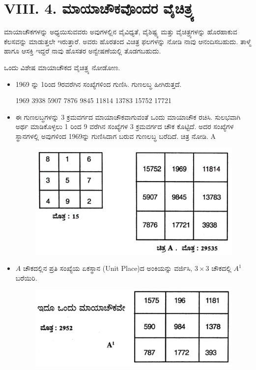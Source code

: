 \section*{VIII. 4. ಮಾಯಾಚೌಕವೊಂದರ ವೈಚಿತ್ರ್ಯ}

ಮಾಯಾಚೌಕಗಳನ್ನು ಅಧ್ಯಯಿಸುವವರು ಅವುಗಳಲ್ಲಿನ ವೈವಿಧ್ಯತೆ, ವೈಶಿಷ್ಟ್ಯ ಮತ್ತು ವೈಚಿತ್ರ್ಯಗಳನ್ನು ಹೊರಹಾಕುವ ಕೆಲಸವನ್ನು ಮಾಡುತ್ತಲೇ ಇರುತ್ತಾರೆ. ಅವರು ಹೊರತಂದ ವಿಚಿತ್ರ ಫಲಗಳನ್ನು ನೋಡಿ ನಾವು ಆನಂದಿಸಬಹುದು. ತಾಳ್ಮೆ ಹಾಗೂ ಆಸಕ್ತಿ ಇದ್ದರೆ ನಾವು ಹೊಸತರ ಅನ್ವೇಷಣೆಯಲ್ಲಿ ತೊಡಗಬಹುದು.

ಒಂದು ವಿಶೇಷ ಮಾಯಾಚೌಕದ ವೈಚಿತ್ರ್ಯ ನೋಡೋಣ.

\begin{itemize}
	\item 1969 ನ್ನು 1ರಿಂದ 9ರವರೆಗಿನ ಸಂಖ್ಯೆಗಳಿಂದ ಗುಣಿಸಿ. ಗುಣಲಬ್ಧ ಹೀಗಿರುತ್ತದೆ.

	1969 3938 5907 7876 9845 11814 13783 15752 17721
	\item ಈ ಗುಣಲಬ್ಧಗಳನ್ನು 3 ಕ್ರಮವರ್ಗದ ಮಾಯಾಚೌಕವಾಗುವಂತೆ ಒಂದು ಮಾಯಾಚೌಕ ರಚಿಸಿ. ಸುಲಭವಾಗಿ ಅರ್ಥ ಮಾಡಿಕೊಳ್ಳಲು 1 ರಿಂದ 9 ವರೆಗಿನ ಸಂಖ್ಯೆಗಳ 3 ಕ್ರಮವರ್ಗದ ಚೌಕ ಕೊಟ್ಟಿದೆ. ಅದರ ಸಂಖ್ಯೆಗಳ ಸ್ಥಾನಗಳಲ್ಲಿ ಅವುಗಳಿಂದ 1969ನ್ನು ಗುಣಿಸಿದಾಗ ಬರುವ ಗುಣಲಬ್ಧ ಬರೆದಿದೆ. ಚಿತ್ರ ನೋಡಿ. A
	\begin{figure}[H]
	\includegraphics{src/figures/chap7/fig7-8.jpg}
	\end{figure}

	\item $A$ ಚೌಕದಲ್ಲಿನ ಪ್ರತಿ ಸಂಖ್ಯೆಯ ಏಕಸ್ಥಾನ (Unit Place)ದ ಅಂಕಿಯನ್ನು ವರ್ಜಿಸಿ, $3 \times 3$ ಚೌಕದಲ್ಲಿ $A^1$ ಬರೆಯಿರಿ.
	\begin{figure}[H]
	\includegraphics{src/figures/chap7/fig7-9.jpg}
	\end{figure}
\end{itemize}

